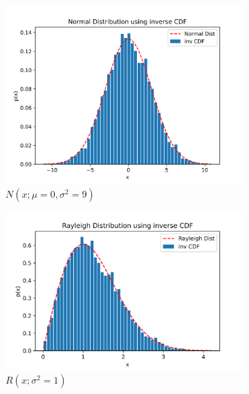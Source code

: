 \documentclass[main.tex]{article}
\begin{document}
    \begin{figure}
        \begin{subfigure}{.45\textwidth}
            \centering
            \includegraphics[width=.95\linewidth]{plot_p6_normal.png}
            \caption{$N(x; \mu = 0, \sigma^2 = 9)$}
            \label{fig:p6-cdfinv-pdf-normal}
        \end{subfigure}
        \begin{subfigure}{.45\linewidth}
            \centering
            \includegraphics[width=.95\linewidth]{plot_p6_rayleigh.png}
            \caption{$R(x; \sigma^2 = 1)$}
            \label{fig:p6-cdfinv-pdf-rayleigh}
        \end{subfigure} \\
        \begin{subfigure}{.45\linewidth}
            \centering

\end{subfigure}
\end{figure}
\end{document}
